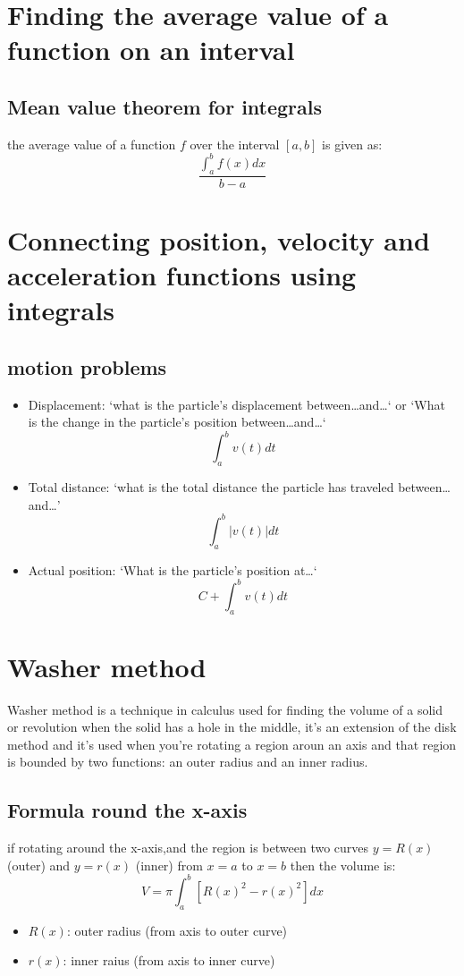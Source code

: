 \documentclass{article}
\begin{document}
                \section{Finding the average value of a function on an interval}
                    \subsection{Mean value theorem for integrals}
                        the average value of a function \(f\) over the interval \([a,b]\) is given as: 
                             \[\frac{\int_{a}^{b} f(x)dx}{b - a}\]    
                \section{Connecting position, velocity and acceleration functions using integrals}
                     \subsection{motion problems}
                            \begin{itemize}
                                \item  Displacement: `what is the particle's displacement between\ldots and\ldots ` or `What is the change in the particle's position between\ldots and\ldots ` \[\int_{a}^{b} v(t)dt\]
                                \item Total distance: `what is the total distance the particle has traveled between\ldots and\ldots ' \[\int_{a}^{b}|v(t)|dt\]
                                \item Actual position: `What is the particle's position at\ldots ` \[C + \int_{a}^{b}v(t)dt\]
                            \end{itemize}
                \section{Washer method} 
                            Washer method is a technique in calculus used for finding the volume of a solid or revolution when the solid has a hole in the middle, it's an extension of the disk method and it's used when you're rotating  a region aroun an axis and that region is bounded by two functions: an outer radius and an inner radius. 
                            \subsection{Formula round the x-axis}
                                if rotating around the x-axis,and the region is between  two curves \(y = R(x)\) (outer) and \(y = r(x)\) (inner) from \(x = a\) to \(x = b\) then the volume is: 
                                \[V = \pi \int_{a}^{b} [{R(x)}^2 - {r(x)}^2]dx\]
                                \begin{itemize}
                                    \item \(R(x)\): outer radius (from axis to outer curve)
                                    \item \(r(x)\): inner raius (from axis to inner curve)
                                \end{itemize}
\end{document}
